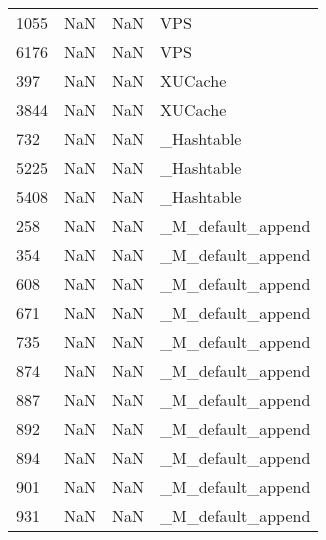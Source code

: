 \begin{tabular}{llll}
1055 &                   NaN &                        NaN &                                       VPS \\
6176 &                   NaN &                        NaN &                                       VPS \\
397  &                   NaN &                        NaN &                                   XUCache \\
3844 &                   NaN &                        NaN &                                   XUCache \\
732  &                   NaN &                        NaN &                                \_Hashtable \\
5225 &                   NaN &                        NaN &                                \_Hashtable \\
5408 &                   NaN &                        NaN &                                \_Hashtable \\
258  &                   NaN &                        NaN &                         \_M\_default\_append \\
354  &                   NaN &                        NaN &                         \_M\_default\_append \\
608  &                   NaN &                        NaN &                         \_M\_default\_append \\
671  &                   NaN &                        NaN &                         \_M\_default\_append \\
735  &                   NaN &                        NaN &                         \_M\_default\_append \\
874  &                   NaN &                        NaN &                         \_M\_default\_append \\
887  &                   NaN &                        NaN &                         \_M\_default\_append \\
892  &                   NaN &                        NaN &                         \_M\_default\_append \\
894  &                   NaN &                        NaN &                         \_M\_default\_append \\
901  &                   NaN &                        NaN &                         \_M\_default\_append \\
931  &                   NaN &                        NaN &                         \_M\_default\_append \\

\end{tabular}

